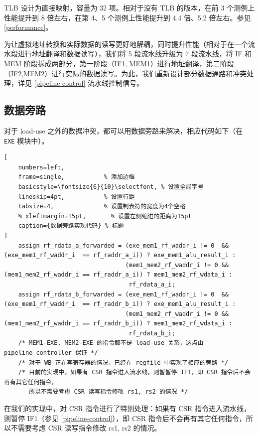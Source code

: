 \documentclass[12pt,a4paper,oneside]{ctexart}
\begin{document}
TLB 设计为直接映射，容量为 32 项。相对于没有 TLB 的版本，在前 3 个测例上性能提升到 8 倍左右，在第 4、5 个测例上性能提升到 4.4 倍、5.2 倍左右。参见 \ref{performance}。

为让虚拟地址转换和实际数据的读写更好地解耦，同时提升性能（相对于在一个流水段进行地址翻译和数据读写），我们将 5 段流水线升级为 7 段流水线，将 IF 和 MEM 阶段拆成两部分，第一阶段（IF1, MEM1）进行地址翻译，第二阶段（IF2,MEM2）进行实际的数据读写。为此，我们重新设计部分数据通路和冲突处理，详见 \ref{pipeline-control} 流水线控制信号。

\subsection{数据旁路}

对于 load-use 之外的数据冲突，都可以用数据旁路来解决，相应代码如下（在 \texttt{EXE} 模块中）。

\begin{lstlisting}[
    numbers=left,
    frame=single,           % 添加边框
    basicstyle=\fontsize{6}{10}\selectfont, % 设置全局字号
    lineskip=4pt,           % 设置行距
    tabsize=4,              % 设置制表符的宽度为4个空格
    % xleftmargin=15pt,       % 设置左侧缩进的距离为15pt
    caption={数据旁路实现代码} % 标题
] 
    assign rf_rdata_a_forwarded = (exe_mem1_rf_waddr_i != 0  && (exe_mem1_rf_waddr_i  == rf_raddr_a_i)) ? exe_mem1_alu_result_i :
                                  (mem1_mem2_rf_waddr_i != 0 && (mem1_mem2_rf_waddr_i == rf_raddr_a_i)) ? mem1_mem2_rf_wdata_i :
                                   rf_rdata_a_i;
    assign rf_rdata_b_forwarded = (exe_mem1_rf_waddr_i != 0  && (exe_mem1_rf_waddr_i  == rf_raddr_b_i)) ? exe_mem1_alu_result_i :
                                  (mem1_mem2_rf_waddr_i != 0 && (mem1_mem2_rf_waddr_i == rf_raddr_b_i)) ? mem1_mem2_rf_wdata_i :
                                   rf_rdata_b_i;
    /* MEM1-EXE, MEM2-EXE 的指令都不是 load-use 关系，这点由 pipeline_controller 保证 */
    /* 对于 WB 正在写寄存器的情况，已经在 regfile 中实现了相应的旁路 */
    /* 目前的实现中，如果有 CSR 指令进入流水线，则暂暂停 IF1，即 CSR 指令后不会再有其它任何指令，
       所以不需要考虑 CSR 读写指令修改 rs1, rs2 的情况 */
\end{lstlisting}

在我们的实现中，对 CSR 指令进行了特别处理：如果有 CSR 指令进入流水线，则暂停 IF1（参见 \ref{pipeline-control}），即 CSR 指令后不会再有其它任何指令，所以不需要考虑 CSR 读写指令修改 rs1, rs2 的情况。
\end{document}
